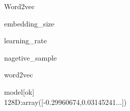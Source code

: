 \documentclass[
 size=12pt,
 paper=smartboard, %
 mode=present, %
 display=slides, %
style=tuliplab,
pauseslide,
fleqn,leqno]{powerdot}
\begin{document}
\begin{slide}{Word2vec}
  \item embedding_size\\ %
  \item learning_rate\\  %
  \item nagetive_sample\\%
\hspace{1.5cm}
\end{slide}

\begin{slide}{word2vec}
 \hspace{0.5cm}  
   \item model[ok]\\
   \vspace{1cm}
   128D:array([-0.29960674,0.03145241...])
  \end{slide}


\\

\end{document}
